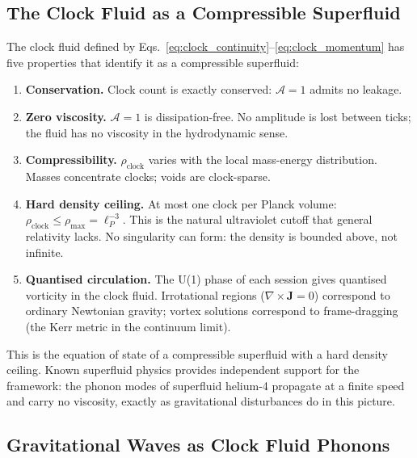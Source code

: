 \subsection{The Clock Fluid as a Compressible Superfluid}
\label{subsec:superfluid}

The clock fluid defined by
Eqs.~\eqref{eq:clock_continuity}--\eqref{eq:clock_momentum} has five
properties that identify it as a compressible superfluid:

\begin{enumerate}
\item \textbf{Conservation.}
    Clock count is exactly conserved: $\mathcal{A}=1$ admits no leakage.

\item \textbf{Zero viscosity.}
    $\mathcal{A}=1$ is dissipation-free.
    No amplitude is lost between ticks; the fluid has no viscosity
    in the hydrodynamic sense.

\item \textbf{Compressibility.}
    $\rho_\text{clock}$ varies with the local mass-energy distribution.
    Masses concentrate clocks; voids are clock-sparse.

\item \textbf{Hard density ceiling.}
    At most one clock per Planck volume:
    $\rho_\text{clock} \leq \rho_\text{max} = \ell_P^{-3}$.
    This is the natural ultraviolet cutoff that general relativity lacks.
    No singularity can form: the density is bounded above, not infinite.

\item \textbf{Quantised circulation.}
    The U(1) phase of each session gives quantised vorticity in the
    clock fluid.
    Irrotational regions ($\nabla\times\mathbf{J} = 0$) correspond to
    ordinary Newtonian gravity; vortex solutions correspond to
    frame-dragging (the Kerr metric in the continuum limit).
\end{enumerate}

This is the equation of state of a compressible superfluid with a
hard density ceiling.
Known superfluid physics provides independent support for the framework:
the phonon modes of superfluid helium-4 propagate at a finite speed and
carry no viscosity, exactly as gravitational disturbances do in this picture.

\subsection{Gravitational Waves as Clock Fluid Phonons}
\label{subsec:grav_waves}

